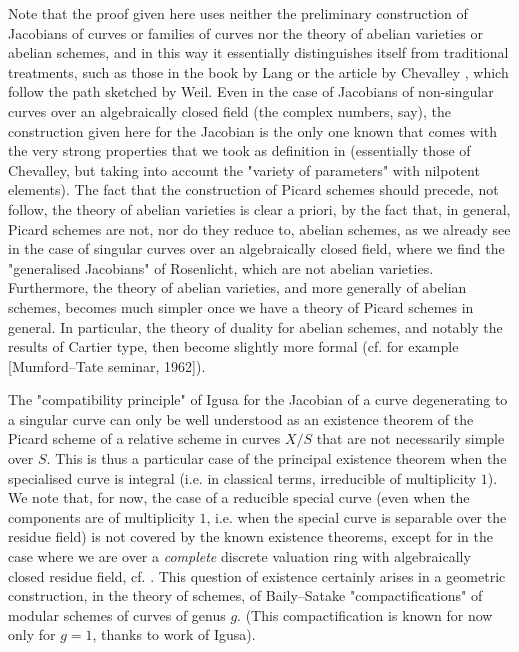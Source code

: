 \begin{remark}\label{fga3.v-5-remark-5.3}
    Note that the proof given here uses neither the preliminary construction of Jacobians of curves or families of curves nor the theory of abelian varieties or abelian schemes, and in this way it essentially distinguishes itself from traditional treatments, such as those in the book by Lang \cite{Lan1959} or the article by Chevalley \cite{Che1960}, which follow the path sketched by Weil.
    Even in the case of Jacobians of non-singular curves over an algebraically closed field (the complex numbers, say), the construction given here for the Jacobian is the only one known that comes with the very strong properties that we took as definition in  (essentially those of Chevalley, but taking into account the "variety of parameters" with nilpotent elements).
    The fact that the construction of Picard schemes should precede, not follow, the theory of abelian varieties is clear a priori, by the fact that, in general, Picard schemes are not, nor do they reduce to, abelian schemes, as we already see in the case of singular curves over an algebraically closed field, where we find the "generalised Jacobians" of Rosenlicht, which are not abelian varieties.
    Furthermore, the theory of abelian varieties, and more generally of abelian schemes, becomes much simpler once we have a theory of Picard schemes in general.
    In particular, the theory of duality for abelian schemes, and notably the results of Cartier type, then become slightly more formal (cf. for example [Mumford–Tate seminar, 1962]).
\end{remark}

\begin{remark}\label{fga3.v-5-remarks-5.4}
    The "compatibility principle" of Igusa for the Jacobian of a curve degenerating to a singular curve can only be well understood as an existence theorem of the Picard scheme of a relative scheme in curves $X/S$ that are not necessarily simple over $S$.
    This is thus a particular case of the principal existence theorem  when the specialised curve is integral (i.e. in classical terms, irreducible of multiplicity $1$).
    We note that, for now, the case of a reducible special curve (even when the components are of multiplicity $1$, i.e. when the special curve is separable over the residue field) is not covered by the known existence theorems, except for in the case where we are over a \emph{complete} discrete valuation ring with algebraically closed residue field, cf. .
    This question of existence certainly arises in a geometric construction, in the theory of schemes, of Baily–Satake "compactifications" of modular schemes of curves of genus $g$.
    (This compactification is known for now only for $g=1$, thanks to work of Igusa).
\end{remark}